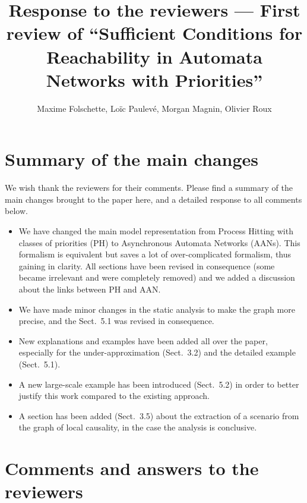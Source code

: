 \documentclass[11pt]{article}
\title{Response to the reviewers --- First review of “Sufficient Conditions for Reachability in Automata Networks with Priorities”}
\author{Maxime Folschette, Loïc Paulevé, Morgan Magnin, Olivier Roux}
\date{}
\newcommand{\answer}[1]{\textcolor{blue}{#1}\vspace*{1em}}
\begin{document}
\maketitle




\section*{Summary of the main changes}

We wish thank the reviewers for their comments.
Please find a summary of the main changes brought to the paper here, and a detailed response to all comments below.

\begin{itemize}
  \item We have changed the main model representation from Process Hitting
    with classes of priorities (PH) to Asynchronous Automata Networks (AANs).
    This formalism is equivalent but saves a lot of over-complicated formalism,
    thus gaining in clarity.
    All sections have been revised in consequence
    (some became irrelevant and were completely removed)
    and we added a discussion about the links between PH and AAN.
  \item We have made minor changes in the static analysis to make the graph more precise,
    and the Sect.~5.1 was revised in consequence.
  \item New explanations and examples have been added all over the paper,
    especially for the under-approximation (Sect.~3.2)
    and the detailed example (Sect.~5.1).
  \item A new large-scale example has been introduced (Sect.~5.2)
    in order to better justify this work compared to the existing approach.
  \item A section has been added (Sect.~3.5) about the extraction of a scenario
    from the graph of local causality, in the case the analysis is conclusive.
\end{itemize}



\section*{Comments and answers to the reviewers}
\end{document}
